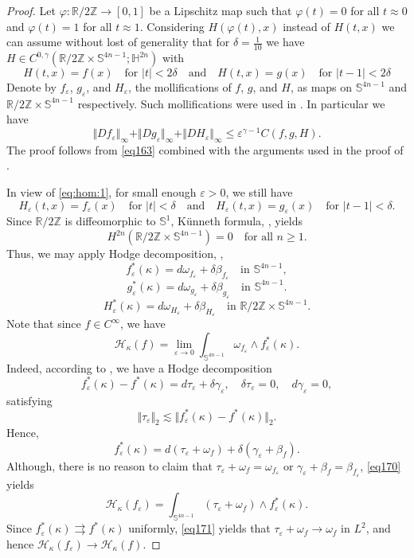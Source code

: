 \documentclass[intlimits,12pt,reqno]{amsart}
\newcommand{\Sph}{\mathbb S}
\newcommand{\R}{\mathbb R}
\newcommand{\Z}{\mathbb Z}
\newcommand{\eps}{\varepsilon}
\numberwithin{equation}{section}
\theoremstyle{definition}
\newcommand{\HI}{\mathcal{H}}
\begin{document}
\begin{proof}
Let $\varphi: \R /2\Z \to [0,1]$ be a Lipschitz map such that $\varphi(t) = 0$ for all $t \approx 0$ and $\varphi(t) = 1$ for all $t \approx 1$. Considering $H(\varphi(t),x)$ instead of $H(t,x)$ we can assume without lost of generality that for $\delta =\frac{1}{10}$ we have $H \in C^{0,\gamma}(\R/2\Z\times \Sph^{4n-1};\mathbb{H}^{2n})$ with 
\begin{equation}
\label{eq:hom:1}
H(t,x) = f(x) \quad \mbox{for $|t| < 2\delta$} \quad \text{and}\quad  H(t,x) = g(x) \quad \text{for $|t - 1| < 2\delta$}
\end{equation}
Denote by $f_\eps$, $g_\eps$, and $H_\eps$, the mollifications of $f$, $g$, and $H$, as maps on $\Sph^{4n-1}$ and $\R /2\Z \times \Sph^{4n-1}$ respectively. Such mollifications were used in . In particular we have
\begin{equation} 
\label{eq:fepsgepsest}
\Vert Df_\eps\Vert_{\infty} + \Vert Dg_\eps\Vert_{\infty} + \Vert DH_\eps\Vert_{\infty} \leq \eps^{\gamma-1} C(f,g,H).
\end{equation}
The proof follows from \eqref{eq163} combined with the arguments used in the proof of .


In view of \eqref{eq:hom:1}, for small enough $\eps > 0$, we still have
\begin{equation}
\label{eq:hom:2}
H_\eps(t,x) = f_\eps(x) \quad \mbox{for $|t| < \delta$} \quad \text{and}\quad  H_\eps(t,x) = g_\eps(x) \quad \text{for $|t-1|<\delta$}.
\end{equation}
Since $\R/2\mathbb{Z}$ is diffeomorphic to $\Sph^1$, K\"unneth formula, \cite[p.\ 47]{BT82}, yields 
\[
 H^{2n}(\R / 2\Z \times \Sph^{4n-1})=0
\quad
\text{for all } n\geq 1. 
\]
Thus, we may apply Hodge decomposition, ,
\[
 f_\eps^\ast (\kappa) = d\omega_{f_\eps} + \delta \beta_{f_\eps} \quad \mbox{in $\mathbb{S}^{4n-1}$},
\]
\[
 g_\eps^\ast (\kappa) = d\omega_{g_\eps} + \delta \beta_{g_\eps} \quad \mbox{in $\mathbb{S}^{4n-1}$}.
\]
\[
 H_\eps^\ast (\kappa) = d\omega_{H_\eps} + \delta \beta_{H_\eps} \quad \mbox{in $\R / 2\Z \times \mathbb{S}^{4n-1}$}.
\]
Note that since $f\in C^\infty$, we have
\begin{equation}
\label{eq164}
 \HI_{\kappa}(f) 
=
\lim_{\eps \to 0} \int_{\Sph^{4n-1}} \omega_{f_\eps} \wedge f_{\eps}^\ast(\kappa).
\end{equation}
Indeed, according to , we have a Hodge decomposition
$$
f_\eps^*(\kappa)-f^*(\kappa)=d\tau_\eps+\delta\gamma_\eps,
\quad
\delta\tau_\eps=0,
\quad
d\gamma_\eps=0,
$$
satisfying
\begin{equation}
\label{eq171}
\Vert\tau_\eps\Vert_2\lesssim\Vert f_\eps^*(\kappa)-f^*(\kappa)\Vert_2.
\end{equation}
Hence,
$$
f^*_\eps(\kappa)=d(\tau_\eps+\omega_f)+\delta(\gamma_\eps+\beta_f).
$$
Although, there is no reason to claim that $\tau_\eps+\omega_f=\omega_{f_\eps}$ or $\gamma_\eps+\beta_f=\beta_{f_\eps}$, \eqref{eq170} yields
$$
\HI_\kappa(f_\eps)=\int_{\Sph^{4n-1}}(\tau_\eps+\omega_f)\wedge f_\eps^*(\kappa).
$$
Since
$f_\eps^*(\kappa)\rightrightarrows f^*(\kappa)$ uniformly, \eqref{eq171} yields that $\tau_\eps+\omega_f\to\omega_f$ in $L^2$, and hence $\HI_\kappa(f_\eps)\to\HI_\kappa(f)$.


\end{proof}
\end{document}
